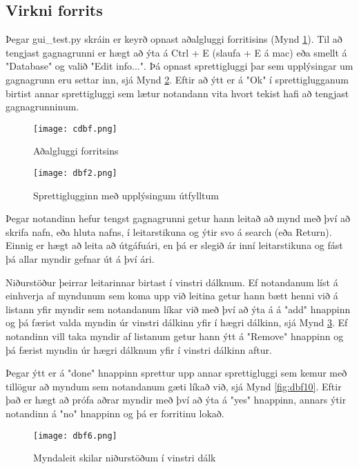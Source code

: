 \documentclass[12pt, git, final]{rureport}
\begin{document}
\subsection{Virkni forrits}
Þegar gui\_test.py skráin er keyrð opnast aðalgluggi forritisins (Mynd \ref{fig:cdbf}). Til að tengjast gagnagrunni er hægt að ýta á Ctrl + E (slaufa + E á mac) eða smellt á "Database" og valið "Edit info...". Þá opnast sprettigluggi þar sem upplýsingar um gagnagrunn eru settar inn, sjá Mynd \ref{fig:dbf2}. Eftir að ýtt er á "Ok" í sprettiglugganum birtist annar sprettigluggi sem lætur notandann vita hvort tekist hafi að tengjast gagnagrunninum.

\begin{figure}[h!]
	\centering 
	\texttt{[image: cdbf.png]}
	\caption{Aðalgluggi forritsins \label{fig:cdbf}}
\end{figure}

\begin{figure}[h!]
	\centering 
	\texttt{[image: dbf2.png]}
	\caption{Sprettiglugginn með upplýsingum útfylltum \label{fig:dbf2}}
\end{figure}

Þegar notandinn hefur tengst gagnagrunni getur hann leitað að mynd með því að skrifa nafn, eða hluta nafns, í leitarstikuna og ýtir svo á search (eða Return). Einnig er hægt að leita að útgáfuári, en þá er slegið ár inní leitarstikuna og fást þá allar myndir gefnar út á því ári.

Niðurstöður þeirrar leitarinnar birtast í vinstri dálknum. Ef notandanum líst á einhverja af myndunum sem koma upp við leitina getur hann bætt henni við á listann yfir myndir sem notandanum líkar við með því að ýta á á "add" hnappinn og þá færist valda myndin úr vinstri dálkinn yfir í hægri dálkinn, sjá Mynd \ref{fig:dbf6}. Ef notandinn vill taka myndir af listanum getur hann ýtt á "Remove" hnappinn og þá færist myndin úr hægri dálknum yfir í vinstri dálkinn aftur.

Þegar ýtt er á "done" hnappinn sprettur upp annar sprettigluggi sem kemur með tillögur að myndum sem notandanum gæti líkað við, sjá Mynd \ref{fig:dbf10}. Eftir það er hægt að prófa aðrar myndir með því að ýta á "yes" hnappinn, annars ýtir notandinn á "no" hnappinn og þá er forritinu lokað.

\begin{figure}
	\centering 
	\texttt{[image: dbf6.png]}
	\caption{Myndaleit skilar niðurstöðum í vinstri dálk\label{fig:dbf6}}
\end{figure}
\end{document}
